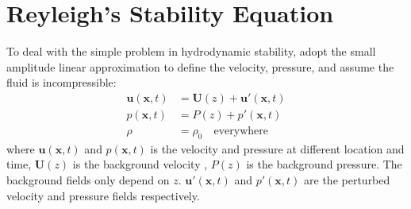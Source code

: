 \section{Reyleigh's Stability Equation}
To deal with the simple problem in hydrodynamic stability, adopt the
small amplitude linear approximation to define the velocity,
pressure, and assume the fluid is incompressible:
\begin{subequations}\label{kh:ln}
\begin{align}
    \mathbf{u}(\mathbf{x},t)&=\mathbf{U}(z)+\mathbf{u}'(\mathbf{x},t)\label{kh:lnu}\\
    p(\mathbf{x},t)&=P(z)+p'(\mathbf{x},t)\label{kh:lnp}\\
    \rho&=\rho_0\quad\text{everywhere}\label{kh:lnrho}
\end{align}
\end{subequations}
where $\mathbf{u}(\mathbf{x},t)$ and $p(\mathbf{x},t)$ is the
velocity and pressure at different location and time,
$\mathbf{U}(z)$ is the background velocity , $P(z)$ is the
background pressure. The background fields only depend on $z$.
$\mathbf{u}'(\mathbf{x},t)$ and $p'(\mathbf{x},t)$ are the perturbed
velocity and pressure fields respectively.

